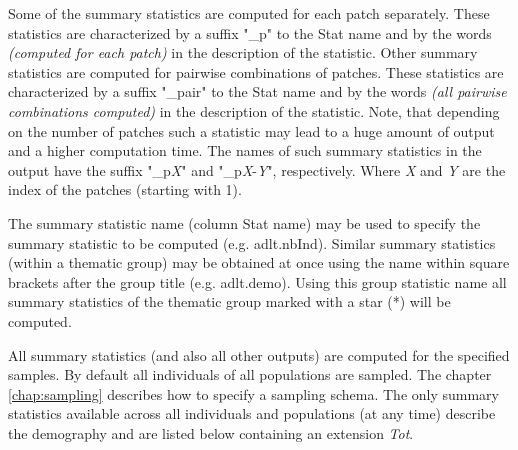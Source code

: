 \documentclass[letterpaper,12pt,oneside]{book}
\begin{document}
Some of the summary statistics are computed for each patch separately. These statistics are characterized by a suffix "\_p" to the \textsf{Stat name} and by the words \textit{(computed for each patch)} in the description of the statistic. Other summary statistics are computed for pairwise combinations of patches. These statistics are characterized by a suffix "\_pair" to the \textsf{Stat name} and by the words \textit{(all pairwise combinations computed)} in the description of the statistic. Note, that depending on the number of patches such a statistic may lead to a huge amount of output and a higher computation time. The names of such summary statistics in the output have the suffix "\_p\textit{X}" and "\_p\textit{X}-\textit{Y}", respectively. Where \textit{X} and \textit{Y} are the index of the patches (starting with 1). 

The summary statistic name (column \textsf{Stat name}) may be used to specify the summary statistic to be computed (e.g. \textsf{adlt.nbInd}). Similar summary statistics (within a thematic group) may be obtained at once using the name within square brackets after the group title (e.g. \textsf{adlt.demo}). Using this group statistic name all summary statistics of the thematic group marked with a star (*) will be computed.

All summary statistics (and also all other outputs) are computed for the specified samples. By default all individuals of all populations are sampled. The chapter \ref{chap:sampling} describes how to specify a sampling schema. The only summary statistics available across all individuals and populations (at any time) describe the demography and are listed below containing an extension \textit{Tot}.   
\\
\\
\end{document}
